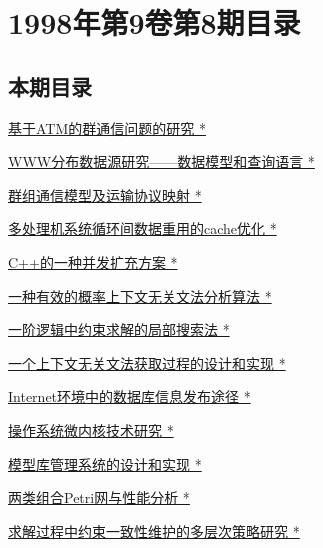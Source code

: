 \documentclass[a4paper]{article}
\begin{document}
\section{\textbf{1998年第9卷第8期目录}}
\subsection{本期目录}
\href{http://www.jos.org.cn/ch/reader/download_pdf.aspx?file_no=19980801&year_id=1998&quarter_id=8&falg=1}{基于ATM的群通信问题的研究 *}

\href{http://www.jos.org.cn/ch/reader/download_pdf.aspx?file_no=19980802&year_id=1998&quarter_id=8&falg=1}{WWW分布数据源研究——数据模型和查询语言 *}

\href{http://www.jos.org.cn/ch/reader/download_pdf.aspx?file_no=19980803&year_id=1998&quarter_id=8&falg=1}{群组通信模型及运输协议映射 *}

\href{http://www.jos.org.cn/ch/reader/download_pdf.aspx?file_no=19980804&year_id=1998&quarter_id=8&falg=1}{多处理机系统循环间数据重用的cache优化 *}

\href{http://www.jos.org.cn/ch/reader/download_pdf.aspx?file_no=19980805&year_id=1998&quarter_id=8&falg=1}{C++的一种并发扩充方案 *}

\href{http://www.jos.org.cn/ch/reader/download_pdf.aspx?file_no=19980806&year_id=1998&quarter_id=8&falg=1}{一种有效的概率上下文无关文法分析算法 *}

\href{http://www.jos.org.cn/ch/reader/download_pdf.aspx?file_no=19980807&year_id=1998&quarter_id=8&falg=1}{一阶逻辑中约束求解的局部搜索法 *}

\href{http://www.jos.org.cn/ch/reader/download_pdf.aspx?file_no=19980808&year_id=1998&quarter_id=8&falg=1}{一个上下文无关文法获取过程的设计和实现 *}

\href{http://www.jos.org.cn/ch/reader/download_pdf.aspx?file_no=19980809&year_id=1998&quarter_id=8&falg=1}{Internet环境中的数据库信息发布途径 *}

\href{http://www.jos.org.cn/ch/reader/download_pdf.aspx?file_no=19980810&year_id=1998&quarter_id=8&falg=1}{操作系统微内核技术研究 *}

\href{http://www.jos.org.cn/ch/reader/download_pdf.aspx?file_no=19980811&year_id=1998&quarter_id=8&falg=1}{模型库管理系统的设计和实现 *}

\href{http://www.jos.org.cn/ch/reader/download_pdf.aspx?file_no=19980812&year_id=1998&quarter_id=8&falg=1}{两类组合Petri网与性能分析 *}

\href{http://www.jos.org.cn/ch/reader/download_pdf.aspx?file_no=19980813&year_id=1998&quarter_id=8&falg=1}{求解过程中约束一致性维护的多层次策略研究 *}
\end{document}
